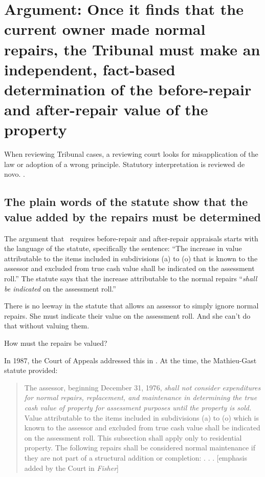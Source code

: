 \documentclass[12pt,\documentclassflag]{michiganCourtOfAppealsBrief}
\begin{document}
\section{Argument: Once it finds that the current owner made normal repairs, the Tribunal must make an independent, fact-based determination of the before-repair and after-repair value of the property}

When reviewing Tribunal cases, a reviewing court looks for misapplication of the law or adoption of a wrong principle. Statutory interpretation is reviewed de novo. . 

\subsection{The plain words of the statute show that the value added by the repairs must be determined}

The argument that \mathieuGast\ requires before-repair and after-repair appraisals starts with the language of the statute, specifically the sentence: ``The increase in value attributable to the items included in subdivisions (a) to (o) that is known to the assessor and excluded from true cash value shall be indicated on the assessment roll.'' The statute says that the increase attributable to the normal repairs ``\emph{shall be indicated} on the assessment roll.''

There is no leeway in the statute that allows an assessor to simply ignore normal repairs. She must indicate their value on the assessment roll. And she can't do that without valuing them.

How must the repairs be valued?

In 1987, the Court of Appeals addressed this in \cite{Fisher}. At the time, the Mathieu-Gast statute provided:

\begin{quote}
The assessor, beginning December 31, 1976, \emph{shall not consider expenditures for normal repairs, replacement, and maintenance in determining the true cash value of property for assessment purposes until the property is sold.} Value attributable to the items included in subdivisions (a) to (o) which is known to the assessor and excluded from true cash value shall be indicated on the assessment roll. This subsection shall apply only to residential property. The following repairs shall be considered normal maintenance if they are not part of a structural addition or completion: . . .
[emphasis added by the Court in \emph{Fisher}]
\end{quote}
\end{document}
